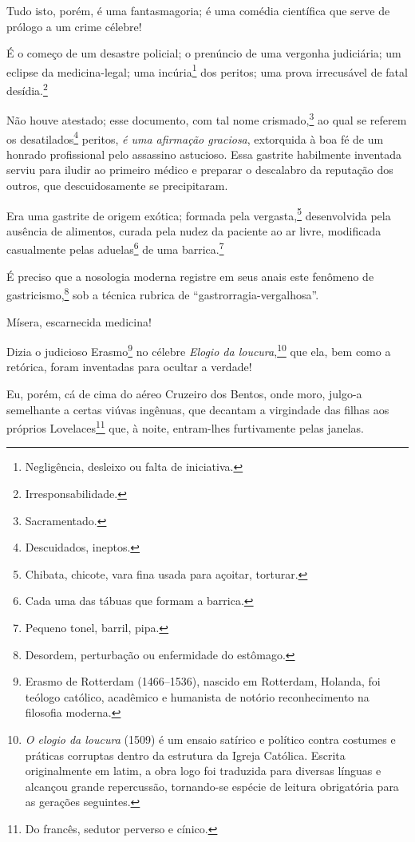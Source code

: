 {Tudo isto, porém, é uma fantasmagoria; é uma comédia científica que
serve de prólogo a um crime célebre!

É o começo de um desastre policial; o prenúncio de uma vergonha
judiciária; um eclipse da medicina-legal; uma incúria\footnote{
  Negligência, desleixo ou falta de iniciativa.} dos peritos; uma prova
irrecusável de fatal desídia.\footnote{Irresponsabilidade.}

Não houve atestado; esse documento, com tal nome crismado,\footnote{
  Sacramentado.} ao qual se referem os desatilados\footnote{
  Descuidados, ineptos.} peritos, \emph{é uma afirmação graciosa},
extorquida à boa fé de um honrado profissional pelo assassino astucioso.
Essa gastrite habilmente inventada serviu para iludir ao primeiro médico
e preparar o descalabro da reputação dos outros, que descuidosamente se
precipitaram.

Era uma gastrite de origem exótica; formada pela vergasta,\footnote{
  Chibata, chicote, vara fina usada para açoitar, torturar.}
desenvolvida pela ausência de alimentos, curada pela nudez da paciente
ao ar livre, modificada casualmente pelas aduelas\footnote{Cada uma
  das tábuas que formam a barrica.} de uma barrica.\footnote{Pequeno
  tonel, barril, pipa.}

É preciso que a nosologia moderna registre em seus anais este fenômeno
de gastricismo,\footnote{Desordem, perturbação ou enfermidade do
  estômago.} sob a técnica rubrica de ``gastrorragia-vergalhosa''.

Mísera, escarnecida medicina!

Dizia o judicioso Erasmo\footnote{Erasmo de Rotterdam (1466--1536), 
  nascido em Rotterdam, Holanda, foi teólogo católico, acadêmico e
  humanista de notório reconhecimento na filosofia moderna.} no célebre
\emph{Elogio da loucura},\footnote{\emph{O elogio da loucura} (1509) é
  um ensaio satírico e político contra costumes e práticas corruptas
  dentro da estrutura da Igreja Católica. Escrita originalmente em
  latim, a obra logo foi traduzida para diversas línguas e alcançou
  grande repercussão, tornando-se espécie de leitura obrigatória para as
  gerações seguintes.} que ela, bem como a retórica, foram inventadas
para ocultar a verdade!

Eu, porém, cá de cima do aéreo Cruzeiro dos Bentos, onde moro, julgo-a
semelhante a certas viúvas ingênuas, que decantam a virgindade das
filhas aos próprios Lovelaces\footnote{Do francês, sedutor perverso e
  cínico.} que, à noite, entram-lhes furtivamente pelas janelas.

}

